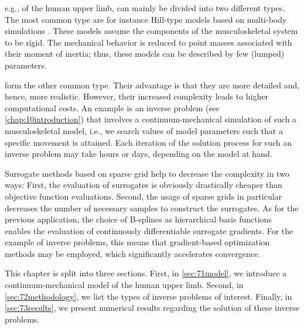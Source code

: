 
\label{chap:70muscle}

e.g., of the human upper limb, can mainly be divided into two different types.
The most common type are 
for instance Hill-type models based on multi-body simulations
.
These models assume the components of the musculoskeletal system
to be rigid.
The mechanical behavior is reduced to point masses
associated with their moment of inertia;
thus, these models can be described by few (lumped) parameters.

 form the other common type.
Their advantage is that they are more detailed and, hence, more realistic.
However, their increased complexity leads to higher computational costs.
An example is an inverse problem (see \cref{chap:10introduction})
that involves a continuum-mechanical simulation of such a
musculoskeletal model,
i.e., we search values of model parameters
such that a specific movement is attained.
Each iteration of the solution process for such an inverse problem
may take hours or days, depending on the model at hand.

Surrogate methods based on sparse grid help to decrease the complexity
in two ways:
First, the evaluation of surrogates is obviously drastically cheaper
than objective function evaluations.
Second, the usage of sparse grids in particular decreases the number
of necessary samples to construct the surrogates.
As for the previous application,
the choice of B-splines as hierarchical basis functions enables
the evaluation of continuously differentiable surrogate gradients.
For the example of inverse problems, this means that
gradient-based optimization methods may be employed,
which significantly accelerates convergence.

This chapter is split into three sections.
First, in \cref{sec:71model}, we introduce a continuum-mechanical
model of the human upper limb.
Second, in \cref{sec:72methodology}, we list the types of inverse problems
of interest.
Finally, in \cref{sec:73results}, we present numerical results
regarding the solution of these inverse problems.

